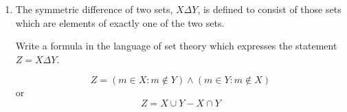 \documentclass[11pt]{amsart}
\begin{document}
\begin{spacing}{1.2}
\begin{enumerate}
\newpage

\item The symmetric difference of two sets, $X \Delta Y$, is defined to consist of those sets which are elements of exactly one of the two sets.

Write a formula in the language of set theory which expresses the statement $Z = X \Delta Y$.

\vspace{1em}

    \[
        Z = {(m \in X : m \notin Y) \wedge (m \in Y : m \notin X)}
    \]
or
  \[
      Z = X \cup Y - X \cap Y
  \]

\end{enumerate}

\end{spacing}
\end{document}
